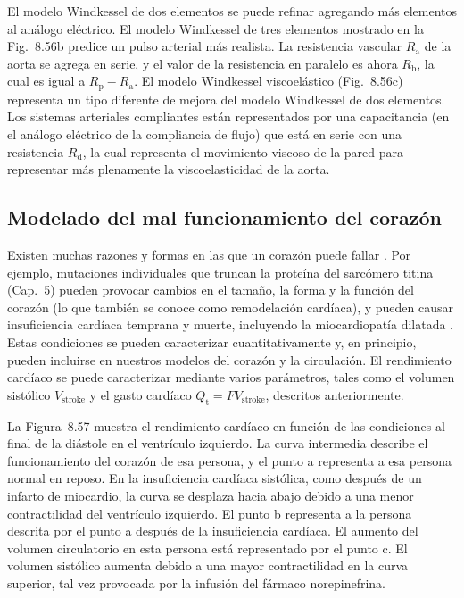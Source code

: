 \documentclass[12pt]{book}
\begin{document}
El modelo Windkessel de dos elementos se puede refinar agregando más elementos al análogo eléctrico. El modelo Windkessel de tres elementos mostrado en la Fig.~8.56b predice un pulso arterial más realista. La resistencia vascular $R_{\text{a}}$ de la aorta se agrega en serie, y el valor de la resistencia en paralelo es ahora $R_{\text{b}}$, la cual es igual a $R_{\text{p}} - R_{\text{a}}$. El modelo Windkessel viscoelástico (Fig.~8.56c) representa un tipo diferente de mejora del modelo Windkessel de dos elementos. Los sistemas arteriales compliantes están representados por una capacitancia (en el análogo eléctrico de la compliancia de flujo) que está en serie con una resistencia $R_{\text{d}}$, la cual representa el movimiento viscoso de la pared para representar más plenamente la viscoelasticidad de la aorta.

\subsection{Modelado del mal funcionamiento del corazón}

Existen muchas razones y formas en las que un corazón puede fallar \cite{46}. Por ejemplo, mutaciones individuales que truncan la proteína del sarcómero titina (Cap.~5) pueden provocar cambios en el tamaño, la forma y la función del corazón (lo que también se conoce como remodelación cardíaca), y pueden causar insuficiencia cardíaca temprana y muerte, incluyendo la miocardiopatía dilatada \cite{33}. Estas condiciones se pueden caracterizar cuantitativamente y, en principio, pueden incluirse en nuestros modelos del corazón y la circulación. El rendimiento cardíaco se puede caracterizar mediante varios parámetros, tales como el volumen sistólico $V_{\text{stroke}}$ y el gasto cardíaco $Q_{\text{t}} = F V_{\text{stroke}}$, descritos anteriormente.

La Figura~8.57 muestra el rendimiento cardíaco en función de las condiciones al final de la diástole en el ventrículo izquierdo. La curva intermedia describe el funcionamiento del corazón de esa persona, y el punto a representa a esa persona normal en reposo. En la insuficiencia cardíaca sistólica, como después de un infarto de miocardio, la curva se desplaza hacia abajo debido a una menor contractilidad del ventrículo izquierdo. El punto b representa a la persona descrita por el punto a después de la insuficiencia cardíaca. El aumento del volumen circulatorio en esta persona está representado por el punto c. El volumen sistólico aumenta debido a una mayor contractilidad en la curva superior, tal vez provocada por la infusión del fármaco norepinefrina.
\end{document}
